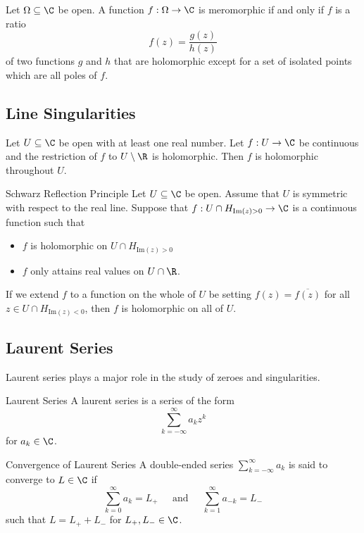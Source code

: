 \documentclass[a4paper]{article}
\begin{document}
\begin{lmm}{}{} Let $\Omega\subseteq\C$ be open. A function $f:\Omega\to\C$ is meromorphic if and only if $f$ is a ratio $$f(z)=\frac{g(z)}{h(z)}$$ of two functions $g$ and $h$ that are holomorphic except for a set of isolated points which are all poles of $f$. 
\end{lmm}

\subsection{Line Singularities}
\begin{thm}{}{} Let $U\subseteq\C$ be open with at least one real number. Let $f:U\to\C$ be continuous and the restriction of $f$ to $U\setminus\R$ is holomorphic. Then $f$ is holomorphic throughout $U$. 
\end{thm}

\begin{thm}{Schwarz Reflection Principle}{} Let $U\subseteq\C$ be open. Assume that $U$ is symmetric with respect to the real line. Suppose that $f:U\cap H_{\text{Im}(z)>0}\to\C$ is a continuous function such that 
\begin{itemize}
\item $f$ is holomorphic on $U\cap H_{\text{Im}(z)>0}$
\item $f$ only attains real values on $U\cap\R$. 
\end{itemize}
If we extend $f$ to a function on the whole of $U$ be setting $f(z)=\overline{f(z)}$ for all $z\in U\cap H_{\text{Im}(z)<0}$, then $f$ is holomorphic on all of $U$. 
\end{thm}

\subsection{Laurent Series}
Laurent series plays a major role in the study of zeroes and singularities. 

\begin{defn}{Laurent Series}{} A laurent series is a series of the form $$\sum_{k=-\infty}^\infty a_kz^k$$ for $a_k\in\C$. 
\end{defn}

\begin{defn}{Convergence of Laurent Series}{} A double-ended series $\sum_{k=-\infty}^\infty a_k$ is said to converge to $L\in\C$ if $$\sum_{k=0}^\infty a_k=L_+\;\;\;\;\text{ and }\;\;\;\;\sum_{k=1}^\infty a_{-k}=L_-$$ such that $L=L_++L_-$ for $L_+,L_-\in\C$. 
\end{defn}
\end{document}
